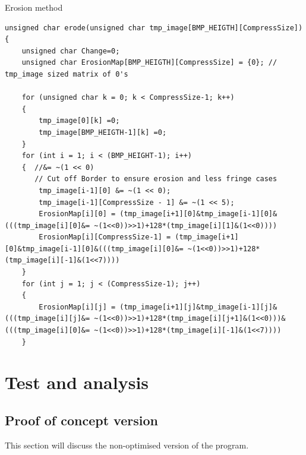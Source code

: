 \documentclass[a4paper, english]{article}
\numberwithin{equation}{section}
\begin{document}
\begin{listing}[H]
    \caption{Erosion method}\label{lst:erosion}
    \begin{verbatim}
unsigned char erode(unsigned char tmp_image[BMP_HEIGTH][CompressSize])
{
	unsigned char Change=0;
    unsigned char ErosionMap[BMP_HEIGTH][CompressSize] = {0}; // tmp_image sized matrix of 0's
   
    for (unsigned char k = 0; k < CompressSize-1; k++)
    {
		tmp_image[0][k] =0;
        tmp_image[BMP_HEIGTH-1][k] =0;
    }    
    for (int i = 1; i < (BMP_HEIGHT-1); i++) 
    {  //&= ~(1 << 0)
	   // Cut off Border to ensure erosion and less fringe cases
        tmp_image[i-1][0] &= ~(1 << 0);
        tmp_image[i-1][CompressSize - 1] &= ~(1 << 5);		
        ErosionMap[i][0] = (tmp_image[i+1][0]&tmp_image[i-1][0]&(((tmp_image[i][0]&= ~(1<<0))>>1)+128*(tmp_image[i][1]&(1<<0))))
		ErosionMap[i][CompressSize-1] = (tmp_image[i+1][0]&tmp_image[i-1][0]&(((tmp_image[i][0]&= ~(1<<0))>>1)+128*(tmp_image[i][-1]&(1<<7))))
	}
    for (int j = 1; j < (CompressSize-1); j++)
    {
		ErosionMap[i][j] = (tmp_image[i+1][j]&tmp_image[i-1][j]&(((tmp_image[i][j]&= ~(1<<0))>>1)+128*(tmp_image[i][j+1]&(1<<0)))&(((tmp_image[i][0]&= ~(1<<0))>>1)+128*(tmp_image[i][-1]&(1<<7))))   
    }
\end{verbatim}
\end{listing}
\section{Test and analysis}
\subsection{Proof of concept version}\label{sec:poctest}
This section will discuss the non-optimised version of the program.
\end{document}
